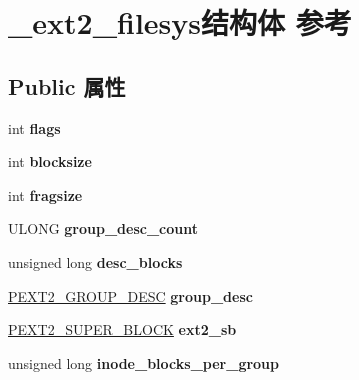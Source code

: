 \hypertarget{struct__ext2__filesys}{}\section{\+\_\+ext2\+\_\+filesys结构体 参考}
\label{struct__ext2__filesys}
\subsection*{Public 属性}
\begin{DoxyCompactItemize}
\item 
\mbox{\label{struct__ext2__filesys_adaff521aa96cb912c57dc551b563ef85}} 
int {\bfseries flags}
\item 
\mbox{\label{struct__ext2__filesys_a86e71ce0d7f3ef3e4cab604cb9f5f519}} 
int {\bfseries blocksize}
\item 
\mbox{\label{struct__ext2__filesys_add9d45c475756372a4f203f3895c0a61}} 
int {\bfseries fragsize}
\item 
\mbox{\label{struct__ext2__filesys_a73e70d5e7b46a293cb9b1c35e53a6c43}} 
U\+L\+O\+NG {\bfseries group\+\_\+desc\+\_\+count}
\item 
\mbox{\label{struct__ext2__filesys_ab6a59bd323bb72ae9d4c2c9e2a41432e}} 
unsigned long {\bfseries desc\+\_\+blocks}
\item 
\mbox{\label{struct__ext2__filesys_aec964b8c2581881ffe13ec54edccead5}} 
\hyperlink{structext2__block__group}{P\+E\+X\+T2\+\_\+\+G\+R\+O\+U\+P\+\_\+\+D\+E\+SC} {\bfseries group\+\_\+desc}
\item 
\mbox{\label{struct__ext2__filesys_a02e460741022884be1ff7cab4d867e2e}} 
\hyperlink{structext2__sblock}{P\+E\+X\+T2\+\_\+\+S\+U\+P\+E\+R\+\_\+\+B\+L\+O\+CK} {\bfseries ext2\+\_\+sb}
\item 
\mbox{\label{struct__ext2__filesys_a27a6b6e474ce0a238a43c482d5196057}} 
unsigned long {\bfseries inode\+\_\+blocks\+\_\+per\+\_\+group}
\item 
\mbox{\label{struct__ext2__filesys_a4700b8a890596d34378edc72eb0b1c9e}} 

\end{DoxyCompactItemize}
